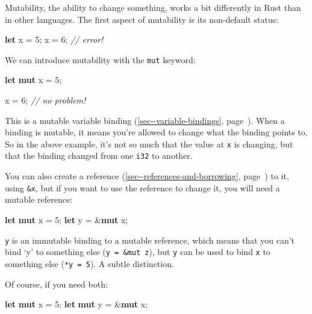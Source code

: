 \documentclass[a4paper,]{book}
\renewcommand*{\hyperlink}[2]{%
 #2 (\autoref{#1}, page~\pageref{#1})}
\newenvironment{Shaded}{\begin{snugshade}}{\end{snugshade}}
\newcommand{\KeywordTok}[1]{\textcolor[rgb]{0.13,0.29,0.53}{\textbf{{#1}}}}
\newcommand{\DecValTok}[1]{\textcolor[rgb]{0.00,0.00,0.81}{{#1}}}
\newcommand{\CommentTok}[1]{\textcolor[rgb]{0.56,0.35,0.01}{\textit{{#1}}}}
\newcommand{\NormalTok}[1]{{#1}}
\begin{document}
Mutability, the ability to change something, works a bit differently in
Rust than in other languages. The first aspect of mutability is its
non-default status:

\begin{Shaded}
\begin{Highlighting}[]
\KeywordTok{let} \NormalTok{x = }\DecValTok{5}\NormalTok{;}
\NormalTok{x = }\DecValTok{6}\NormalTok{; }\CommentTok{// error!}
\end{Highlighting}
\end{Shaded}

We can introduce mutability with the \texttt{mut} keyword:

\begin{Shaded}
\begin{Highlighting}[]
\KeywordTok{let} \KeywordTok{mut} \NormalTok{x = }\DecValTok{5}\NormalTok{;}

\NormalTok{x = }\DecValTok{6}\NormalTok{; }\CommentTok{// no problem!}
\end{Highlighting}
\end{Shaded}

This is a mutable \protect\hyperlink{sec--variable-bindings}{variable
binding}. When a binding is mutable, it means you're allowed to change
what the binding points to. So in the above example, it's not so much
that the value at \texttt{x} is changing, but that the binding changed
from one \texttt{i32} to another.

You can also create a
\protect\hyperlink{sec--references-and-borrowing}{reference} to it,
using \texttt{\&x}, but if you want to use the reference to change it,
you will need a mutable reference:

\begin{Shaded}
\begin{Highlighting}[]
\KeywordTok{let} \KeywordTok{mut} \NormalTok{x = }\DecValTok{5}\NormalTok{;}
\KeywordTok{let} \NormalTok{y = &}\KeywordTok{mut} \NormalTok{x;}
\end{Highlighting}
\end{Shaded}

\texttt{y} is an immutable binding to a mutable reference, which means
that you can't bind `y' to something else (\texttt{y\ =\ \&mut\ z}), but
\texttt{y} can be used to bind \texttt{x} to something else
(\texttt{*y\ =\ 5}). A subtle distinction.

Of course, if you need both:

\begin{Shaded}
\begin{Highlighting}[]
\KeywordTok{let} \KeywordTok{mut} \NormalTok{x = }\DecValTok{5}\NormalTok{;}
\KeywordTok{let} \KeywordTok{mut} \NormalTok{y = &}\KeywordTok{mut} \NormalTok{x;}
\end{Highlighting}
\end{Shaded}
\end{document}
